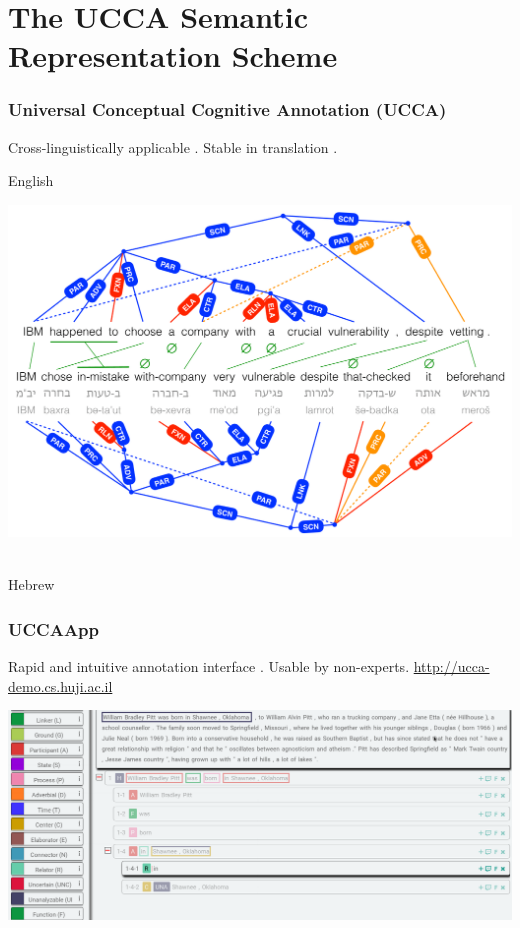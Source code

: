 \documentclass[t]{beamer}
\begin{document}
\section{The UCCA Semantic Representation Scheme}

\begin{frame}
\frametitle{Universal Conceptual Cognitive Annotation (UCCA)}
Cross-linguistically applicable \cite{abend2013universal}.
Stable in translation \cite{sulem2015conceptual}.

\vfill
English\\
\vspace{-1cm}
\begin{adjustbox}{center}
  \includegraphics[width=\textwidth,height=\textheight,keepaspectratio]{crosslinguistic.png}
\end{adjustbox}
\\
\vspace{-1cm}
Hebrew
\end{frame}

\begin{frame}
\frametitle{UCCAApp}
Rapid and intuitive annotation interface \cite{abend2017uccaapp}.
Usable by non-experts.
\footnotesize\url{http://ucca-demo.cs.huji.ac.il}
\vfill
\begin{adjustbox}{center}
  \includegraphics[width=\pagewidth,height=\textheight,keepaspectratio]{uccaapp.png}
\end{adjustbox}
\end{frame}
\end{document}
